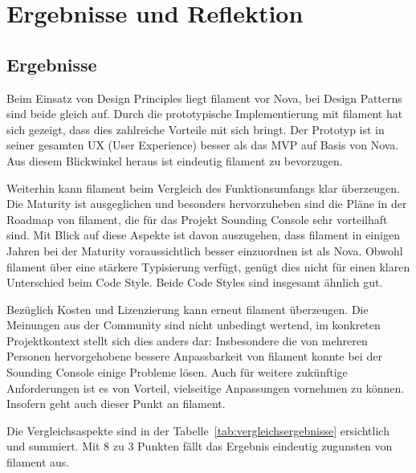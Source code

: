 
\newpage


\section{Ergebnisse und Reflektion}

\subsection{Ergebnisse}
Beim Einsatz von Design Principles liegt filament vor Nova, bei Design Patterns sind beide gleich auf.
Durch die prototypische Implementierung mit filament hat sich gezeigt, dass dies zahlreiche Vorteile mit sich bringt.
Der Prototyp ist in seiner gesamten UX (User Experience) besser als das MVP auf Basis von Nova.
Aus diesem Blickwinkel heraus ist eindeutig filament zu bevorzugen.

Weiterhin kann filament beim Vergleich des Funktionsumfangs klar überzeugen.
Die Maturity ist ausgeglichen und besonders hervorzuheben sind die Pläne in der Roadmap von filament, die für das Projekt Sounding Console sehr vorteilhaft sind.
Mit Blick auf diese Aspekte ist davon auszugehen, dass filament in einigen Jahren bei der Maturity voraussichtlich besser einzuordnen ist als Nova.
Obwohl filament über eine stärkere Typisierung verfügt, genügt dies nicht für einen klaren Unterschied beim Code Style.
Beide Code Styles sind insgesamt ähnlich gut.

Bezüglich Kosten und Lizenzierung kann erneut filament überzeugen.
Die Meinungen aus der Community sind nicht unbedingt wertend, im konkreten Projektkontext stellt sich dies anders dar:
Insbesondere die von mehreren Personen hervorgehobene bessere Anpassbarkeit von filament konnte bei der Sounding Console einige Probleme lösen.
Auch für weitere zukünftige Anforderungen ist es von Vorteil, vielseitige Anpassungen vornehmen zu können.
Insofern geht auch dieser Punkt an filament.

Die Vergleichsaspekte sind in der Tabelle~\ref{tab:vergleichsergebnisse} ersichtlich und summiert.
Mit 8 zu 3 Punkten fällt das Ergebnis eindeutig zugunsten von filament aus.

